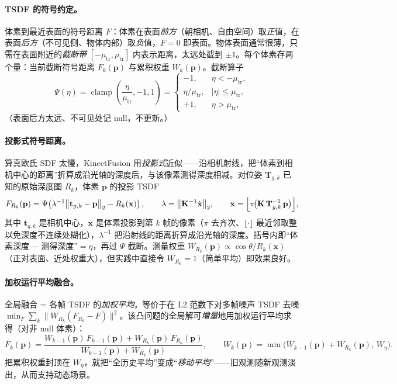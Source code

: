\paragraph{TSDF 的符号约定。}
体素到最近表面的符号距离 $F$：体素在表面\emph{前方}（朝相机、自由空间）取\emph{正}值，在表面\emph{后方}（不可见侧、物体内部）取\emph{负}值，$F=0$ 即表面。物体表面通常很薄，只需在表面附近的\emph{截断带} $[-\mu_{\mathrm{tr}},\mu_{\mathrm{tr}}]$ 内表示距离，太远处截到 $\pm 1$。每个体素存两个量：当前截断符号距离 $F_k(\mathbf{p})$ 与累积权重 $W_k(\mathbf{p})$。截断算子
\begin{equation}
  \Psi(\eta)=\operatorname{clamp}\!\left(\frac{\eta}{\mu_{\mathrm{tr}}},-1,1\right)=
  \begin{cases}-1,&\eta<-\mu_{\mathrm{tr}},\\ \eta/\mu_{\mathrm{tr}},&|\eta|\le\mu_{\mathrm{tr}},\\ +1,&\eta>\mu_{\mathrm{tr}},\end{cases}
  \label{eq:dense-tsdf-trunc}
\end{equation}
（表面后方太远、不可见处记 null，不更新。）

\paragraph{投影式符号距离。}
算真欧氏 SDF 太慢，KinectFusion 用\emph{投影式}近似——沿相机射线，把“体素到相机中心的距离”折算成沿光轴的深度后，与该像素测得深度相减。对位姿 $\mathbf{T}_{g,k}$ 已知的原始深度图 $R_k$，体素 $\mathbf{p}$ 的投影 TSDF
\begin{equation}
  F_{R_k}(\mathbf{p})=\Psi\!\left(\lambda^{-1}\bigl\|\mathbf{t}_{g,k}-\mathbf{p}\bigr\|_2-R_k(\mathbf{x})\right),\qquad
  \lambda=\bigl\|\mathbf{K}^{-1}\dot{\mathbf{x}}\bigr\|_2,\qquad
  \mathbf{x}=\Bigl\lfloor \pi\!\bigl(\mathbf{K}\,\mathbf{T}_{g,k}^{-1}\,\mathbf{p}\bigr)\Bigr\rfloor,
  \label{eq:dense-tsdf-proj}
\end{equation}
其中 $\mathbf{t}_{g,k}$ 是相机中心，$\mathbf{x}$ 是体素投影到第 $k$ 帧的像素（$\pi$ 去齐次、$\lfloor\cdot\rfloor$ 最近邻取整以免深度不连续处糊化），$\lambda^{-1}$ 把沿射线的距离折算成沿光轴的深度。括号内即“体素深度 $-$ 测得深度”$=\eta$，再过 $\Psi$ 截断。测量权重 $W_{R_k}(\mathbf{p})\propto\cos\theta/R_k(\mathbf{x})$（正对表面、近处权重大），但实践中直接令 $W_{R_k}=1$（简单平均）即效果良好。

\paragraph{加权运行平均融合。}
全局融合 = 各帧 TSDF 的\emph{加权平均}，等价于在 L2 范数下对多帧噪声 TSDF 去噪 $\min_{F}\sum_k\|W_{R_k}(F_{R_k}-F)\|^2$。该凸问题的全局解可\emph{增量}地用加权运行平均求得（对非 null 体素）：
\begin{equation}
  F_k(\mathbf{p})=\frac{W_{k-1}(\mathbf{p})\,F_{k-1}(\mathbf{p})+W_{R_k}(\mathbf{p})\,F_{R_k}(\mathbf{p})}{W_{k-1}(\mathbf{p})+W_{R_k}(\mathbf{p})},\qquad
  W_k(\mathbf{p})=\min\!\bigl(W_{k-1}(\mathbf{p})+W_{R_k}(\mathbf{p}),\,W_\eta\bigr).
  \label{eq:dense-tsdf-fuse}
\end{equation}
把累积权重封顶在 $W_\eta$，就把“全历史平均”变成“\emph{移动平均}”——旧观测随新观测淡出，从而支持动态场景。

